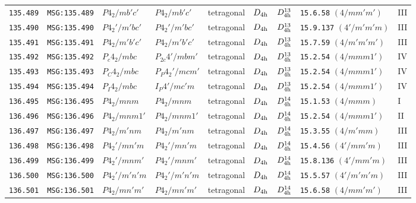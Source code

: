 \documentclass[fleqn,10pt]{jsarticle}
\begin{document}
\begin{center}
\begin{longtable}{lllllllll}
\texttt{135.489} & \texttt{MSG:135.489} & $P4_{2}/mb'c'$ & $P4_{2}/mb'c'$ & tetragonal & $D_{\rm 4h}$ & $D_{\rm 4h}^{13}$ & \texttt{15.6.58} $(4/mm'm')$ & III \\
\texttt{135.490} & \texttt{MSG:135.490} & $P4_{2}'/m'bc'$ & $P4_{2}'/m'bc'$ & tetragonal & $D_{\rm 4h}$ & $D_{\rm 4h}^{13}$ & \texttt{15.9.137} $(4'/m'm'm)$ & III \\
\texttt{135.491} & \texttt{MSG:135.491} & $P4_{2}/m'b'c'$ & $P4_{2}/m'b'c'$ & tetragonal & $D_{\rm 4h}$ & $D_{\rm 4h}^{13}$ & \texttt{15.7.59} $(4/m'm'm')$ & III \\
\texttt{135.492} & \texttt{MSG:135.492} & $P_{c}4_{2}/mbc$ & $P_{2c}4'/mbm'$ & tetragonal & $D_{\rm 4h}$ & $D_{\rm 4h}^{13}$ & \texttt{15.2.54} $(4/mmm1')$ & IV \\
\texttt{135.493} & \texttt{MSG:135.493} & $P_{C}4_{2}/mbc$ & $P_{P}4_{2}'/mcm'$ & tetragonal & $D_{\rm 4h}$ & $D_{\rm 4h}^{13}$ & \texttt{15.2.54} $(4/mmm1')$ & IV \\
\texttt{135.494} & \texttt{MSG:135.494} & $P_{I}4_{2}/mbc$ & $I_{P}4'/mc'm$ & tetragonal & $D_{\rm 4h}$ & $D_{\rm 4h}^{13}$ & \texttt{15.2.54} $(4/mmm1')$ & IV \\ \hline
\texttt{136.495} & \texttt{MSG:136.495} & $P4_{2}/mnm$ & $P4_{2}/mnm$ & tetragonal & $D_{\rm 4h}$ & $D_{\rm 4h}^{14}$ & \texttt{15.1.53} $(4/mmm)$ & I \\
\texttt{136.496} & \texttt{MSG:136.496} & $P4_{2}/mnm1'$ & $P4_{2}/mnm1'$ & tetragonal & $D_{\rm 4h}$ & $D_{\rm 4h}^{14}$ & \texttt{15.2.54} $(4/mmm1')$ & II \\
\texttt{136.497} & \texttt{MSG:136.497} & $P4_{2}/m'nm$ & $P4_{2}/m'nm$ & tetragonal & $D_{\rm 4h}$ & $D_{\rm 4h}^{14}$ & \texttt{15.3.55} $(4/m'mm)$ & III \\
\texttt{136.498} & \texttt{MSG:136.498} & $P4_{2}'/mn'm$ & $P4_{2}'/mn'm$ & tetragonal & $D_{\rm 4h}$ & $D_{\rm 4h}^{14}$ & \texttt{15.4.56} $(4'/mm'm)$ & III \\
\texttt{136.499} & \texttt{MSG:136.499} & $P4_{2}'/mnm'$ & $P4_{2}'/mnm'$ & tetragonal & $D_{\rm 4h}$ & $D_{\rm 4h}^{14}$ & \texttt{15.8.136} $(4'/mm'm)$ & III \\
\texttt{136.500} & \texttt{MSG:136.500} & $P4_{2}'/m'n'm$ & $P4_{2}'/m'n'm$ & tetragonal & $D_{\rm 4h}$ & $D_{\rm 4h}^{14}$ & \texttt{15.5.57} $(4'/m'm'm)$ & III \\
\texttt{136.501} & \texttt{MSG:136.501} & $P4_{2}/mn'm'$ & $P4_{2}/mn'm'$ & tetragonal & $D_{\rm 4h}$ & $D_{\rm 4h}^{14}$ & \texttt{15.6.58} $(4/mm'm')$ & III \\

\end{longtable}
\end{center}
\end{document}
